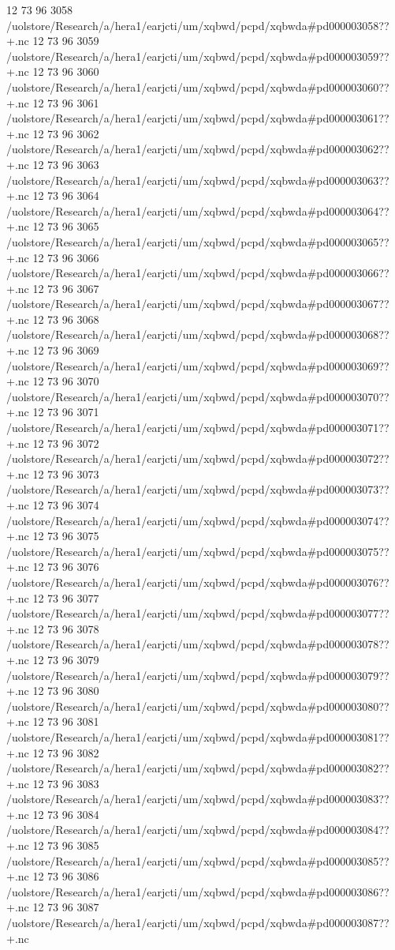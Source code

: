 12 73 96
3058
/uolstore/Research/a/hera1/earjcti/um/xqbwd/pcpd/xqbwda#pd000003058??+.nc
12 73 96
3059
/uolstore/Research/a/hera1/earjcti/um/xqbwd/pcpd/xqbwda#pd000003059??+.nc
12 73 96
3060
/uolstore/Research/a/hera1/earjcti/um/xqbwd/pcpd/xqbwda#pd000003060??+.nc
12 73 96
3061
/uolstore/Research/a/hera1/earjcti/um/xqbwd/pcpd/xqbwda#pd000003061??+.nc
12 73 96
3062
/uolstore/Research/a/hera1/earjcti/um/xqbwd/pcpd/xqbwda#pd000003062??+.nc
12 73 96
3063
/uolstore/Research/a/hera1/earjcti/um/xqbwd/pcpd/xqbwda#pd000003063??+.nc
12 73 96
3064
/uolstore/Research/a/hera1/earjcti/um/xqbwd/pcpd/xqbwda#pd000003064??+.nc
12 73 96
3065
/uolstore/Research/a/hera1/earjcti/um/xqbwd/pcpd/xqbwda#pd000003065??+.nc
12 73 96
3066
/uolstore/Research/a/hera1/earjcti/um/xqbwd/pcpd/xqbwda#pd000003066??+.nc
12 73 96
3067
/uolstore/Research/a/hera1/earjcti/um/xqbwd/pcpd/xqbwda#pd000003067??+.nc
12 73 96
3068
/uolstore/Research/a/hera1/earjcti/um/xqbwd/pcpd/xqbwda#pd000003068??+.nc
12 73 96
3069
/uolstore/Research/a/hera1/earjcti/um/xqbwd/pcpd/xqbwda#pd000003069??+.nc
12 73 96
3070
/uolstore/Research/a/hera1/earjcti/um/xqbwd/pcpd/xqbwda#pd000003070??+.nc
12 73 96
3071
/uolstore/Research/a/hera1/earjcti/um/xqbwd/pcpd/xqbwda#pd000003071??+.nc
12 73 96
3072
/uolstore/Research/a/hera1/earjcti/um/xqbwd/pcpd/xqbwda#pd000003072??+.nc
12 73 96
3073
/uolstore/Research/a/hera1/earjcti/um/xqbwd/pcpd/xqbwda#pd000003073??+.nc
12 73 96
3074
/uolstore/Research/a/hera1/earjcti/um/xqbwd/pcpd/xqbwda#pd000003074??+.nc
12 73 96
3075
/uolstore/Research/a/hera1/earjcti/um/xqbwd/pcpd/xqbwda#pd000003075??+.nc
12 73 96
3076
/uolstore/Research/a/hera1/earjcti/um/xqbwd/pcpd/xqbwda#pd000003076??+.nc
12 73 96
3077
/uolstore/Research/a/hera1/earjcti/um/xqbwd/pcpd/xqbwda#pd000003077??+.nc
12 73 96
3078
/uolstore/Research/a/hera1/earjcti/um/xqbwd/pcpd/xqbwda#pd000003078??+.nc
12 73 96
3079
/uolstore/Research/a/hera1/earjcti/um/xqbwd/pcpd/xqbwda#pd000003079??+.nc
12 73 96
3080
/uolstore/Research/a/hera1/earjcti/um/xqbwd/pcpd/xqbwda#pd000003080??+.nc
12 73 96
3081
/uolstore/Research/a/hera1/earjcti/um/xqbwd/pcpd/xqbwda#pd000003081??+.nc
12 73 96
3082
/uolstore/Research/a/hera1/earjcti/um/xqbwd/pcpd/xqbwda#pd000003082??+.nc
12 73 96
3083
/uolstore/Research/a/hera1/earjcti/um/xqbwd/pcpd/xqbwda#pd000003083??+.nc
12 73 96
3084
/uolstore/Research/a/hera1/earjcti/um/xqbwd/pcpd/xqbwda#pd000003084??+.nc
12 73 96
3085
/uolstore/Research/a/hera1/earjcti/um/xqbwd/pcpd/xqbwda#pd000003085??+.nc
12 73 96
3086
/uolstore/Research/a/hera1/earjcti/um/xqbwd/pcpd/xqbwda#pd000003086??+.nc
12 73 96
3087
/uolstore/Research/a/hera1/earjcti/um/xqbwd/pcpd/xqbwda#pd000003087??+.nc
